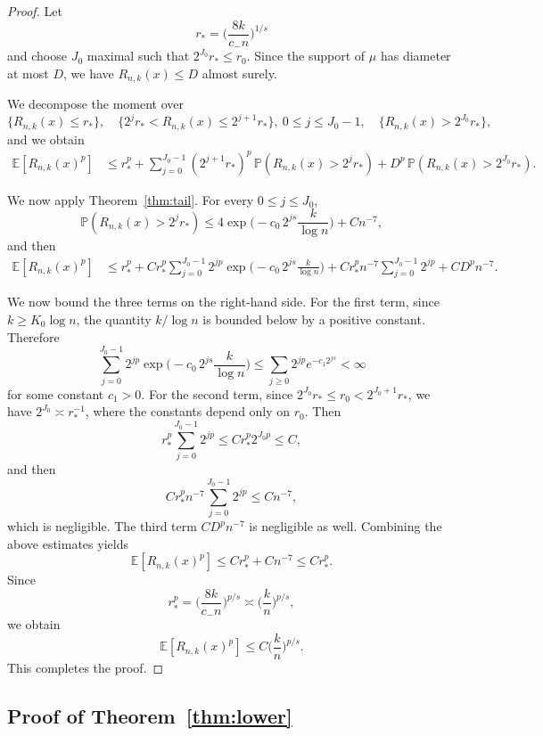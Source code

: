 \documentclass[12pt]{article}
\theoremstyle{definition}
\begin{document}
\begin{proof}

Let $$r_* = \Big(\frac{8k}{c_- n}\Big)^{1/s}$$ and choose \(J_0\) maximal such that $2^{J_0}r_* \le r_0$. Since the support of \(\mu\) has diameter at most \(D\), we have $R_{n,k}(x)\le D$ almost surely.

We decompose the moment over
\[
\{R_{n,k}(x)\le r_*\},
\quad
\{2^j r_* < R_{n,k}(x)\le 2^{j+1}r_*\},\ 0\le j\le J_0-1,
\quad
\{R_{n,k}(x)>2^{J_0}r_*\},
\]
and we obtain
\begin{align*}
\mathbb E[R_{n,k}(x)^p]
&\le r_*^p
+ \sum_{j=0}^{J_0-1}(2^{j+1}r_*)^p\,\mathbb P(R_{n,k}(x)>2^j r_*) + D^p\,\mathbb P(R_{n,k}(x)>2^{J_0}r_*).
\end{align*}

We now apply Theorem~\ref{thm:tail}. For every \(0\le j\le J_0\),
\[
\mathbb P(R_{n,k}(x)>2^j r_*)
\le
4\exp \Big(-c_0\,2^{js}\frac{k}{\log n}\Big)+Cn^{-7},
\]
and then
\begin{align*}
\mathbb E[R_{n,k}(x)^p]
&\le r_*^p
+ C r_*^p \sum_{j=0}^{J_0-1}2^{jp}
\exp \Big(-c_0\,2^{js}\frac{k}{\log n}\Big) + C r_*^p n^{-7}\sum_{j=0}^{J_0-1}2^{jp}
+ C D^p n^{-7}.
\end{align*}

We now bound the three terms on the right-hand side. For the first term, since \(k\ge K_0\log n\), the quantity \(k/\log n\) is bounded below by a positive constant. Therefore
\[
\sum_{j=0}^{J_0-1}2^{jp}
\exp \Big(-c_0\,2^{js}\frac{k}{\log n}\Big)
\le
\sum_{j\ge 0}2^{jp}e^{-c_1 2^{js}}
<\infty
\]
for some constant \(c_1>0\). For the second term, since \(2^{J_0}r_*\le r_0<2^{J_0+1}r_*\), we have $2^{J_0}\asymp r_*^{-1}$, where the constants depend only on \(r_0\). Then
\[
r_*^p\sum_{j=0}^{J_0-1}2^{jp}
\le
C r_*^p 2^{J_0 p}
\le C,
\]
and then
\[
C r_*^p n^{-7}\sum_{j=0}^{J_0-1}2^{jp}
\le C n^{-7},
\]
which is negligible. The third term \(C D^p n^{-7}\) is negligible as well. Combining the above estimates yields
\[
\mathbb E[R_{n,k}(x)^p]
\le C r_*^p + C n^{-7}
\le C r_*^p.
\]
Since
\[
r_*^p
=
\Big(\frac{8k}{c_- n}\Big)^{p/s}
\asymp
\Big(\frac{k}{n}\Big)^{p/s},
\]
we obtain
\[
\mathbb E[R_{n,k}(x)^p]
\le
C\Big(\frac{k}{n}\Big)^{p/s}.
\]
This completes the proof.
\end{proof}


\subsection{Proof of Theorem~\ref{thm:lower}}
\end{document}
